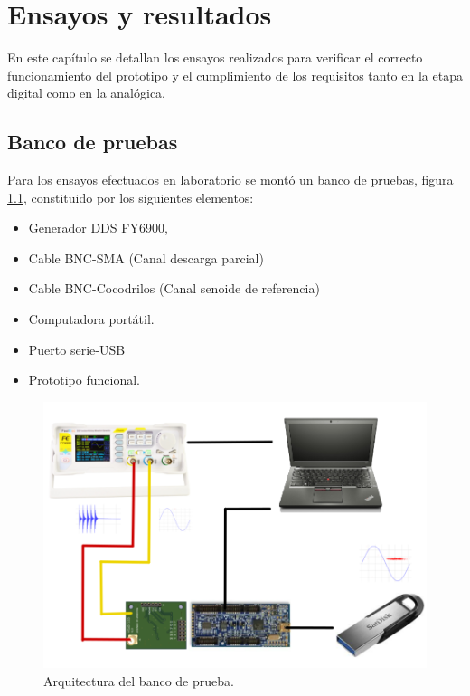 
\chapter{Ensayos y resultados} %

\label{Chapter4} %
En este capítulo se detallan los ensayos realizados para verificar el correcto funcionamiento del prototipo y el cumplimiento de los requisitos tanto en la etapa digital como en la analógica.

\section{Banco de pruebas}
Para los ensayos efectuados en laboratorio se montó un banco de pruebas, figura \ref{fig:bancoDePruebas}, constituido por los siguientes elementos:

\begin{itemize}
\item Generador DDS FY6900,
\item Cable BNC-SMA (Canal descarga parcial)
\item Cable BNC-Cocodrilos (Canal senoide de referencia)
\item Computadora portátil. 
\item Puerto serie-USB
\item Prototipo funcional.
\end{itemize}


\begin{figure}[ht]
	\centering
	\includegraphics[width=120mm]{./Figures/bancoDePruebas.png}
	\caption{Arquitectura del banco de prueba.}
	\label{fig:bancoDePruebas}
\end{figure}

